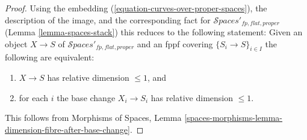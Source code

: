 \documentclass{stacks-project}
\theoremstyle{plain}
\theoremstyle{definition}
\theoremstyle{remark}
\numberwithin{equation}{subsection}
\def\Spacesstack{\mathcal{S}\!\mathit{paces}}
\begin{document}
\begin{proof}
Using the embedding (\ref{equation-curves-over-proper-spaces}),
the description of the image, and
the corresponding fact for $\Spacesstack'_{fp, flat, proper}$
(Lemma \ref{lemma-spaces-stack})
this reduces to the following statement: Given an object
$X \to S$ of $\Spacesstack'_{fp, flat, proper}$
and an fppf covering $\{S_i \to S\}_{i \in I}$
the following are equivalent:
\begin{enumerate}
\item $X \to S$ has relative dimension $\leq 1$, and
\item for each $i$ the base change $X_i \to S_i$
has relative dimension $\leq 1$.
\end{enumerate}
This follows from Morphisms of Spaces, Lemma
\ref{spaces-morphisms-lemma-dimension-fibre-after-base-change}.
\end{proof}
\end{document}
